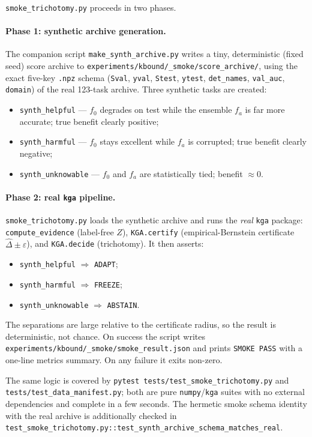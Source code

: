\texttt{smoke\_trichotomy.py} proceeds in two phases.

\paragraph{Phase 1: synthetic archive generation.}
The companion script \texttt{make\_synth\_archive.py} writes a tiny,
deterministic (fixed seed) score archive to
\texttt{experiments/kbound/\_smoke/score\_archive/}, using the exact five-key
\texttt{.npz} schema (\texttt{Sval}, \texttt{yval}, \texttt{Stest},
\texttt{ytest}, \texttt{det\_names}, \texttt{val\_auc}, \texttt{domain}) of the
real 123-task archive.  Three synthetic tasks are created:
\begin{itemize}
  \item \texttt{synth\_helpful} --- $f_0$ degrades on test while the ensemble
    $f_a$ is far more accurate; true benefit clearly positive;
  \item \texttt{synth\_harmful} --- $f_0$ stays excellent while $f_a$ is
    corrupted; true benefit clearly negative;
  \item \texttt{synth\_unknowable} --- $f_0$ and $f_a$ are statistically tied;
    benefit $\approx 0$.
\end{itemize}

\paragraph{Phase 2: real \texttt{kga} pipeline.}
\texttt{smoke\_trichotomy.py} loads the synthetic archive and runs the
\emph{real} \texttt{kga} package: \texttt{compute\_evidence} (label-free $Z$),
\texttt{KGA.certify} (empirical-Bernstein certificate $\widehat\Delta \pm
\varepsilon$), and \texttt{KGA.decide} (trichotomy).  It then asserts:
\begin{itemize}
  \item \texttt{synth\_helpful} $\Rightarrow$ \texttt{ADAPT};
  \item \texttt{synth\_harmful} $\Rightarrow$ \texttt{FREEZE};
  \item \texttt{synth\_unknowable} $\Rightarrow$ \texttt{ABSTAIN}.
\end{itemize}
The separations are large relative to the certificate radius, so the result is
deterministic, not chance.  On success the script writes
\texttt{experiments/kbound/\_smoke/smoke\_result.json} and prints
\texttt{SMOKE PASS} with a one-line metrics summary.  On any failure it exits
non-zero.

The same logic is covered by \texttt{pytest tests/test\_smoke\_trichotomy.py}
and \texttt{tests/test\_data\_manifest.py}; both are pure
\texttt{numpy}/\texttt{kga} suites with no external dependencies and complete
in a few seconds.  The hermetic smoke schema identity with the real archive is
additionally checked in
\texttt{test\_smoke\_trichotomy.py::test\_synth\_archive\_schema\_matches\_real}.

